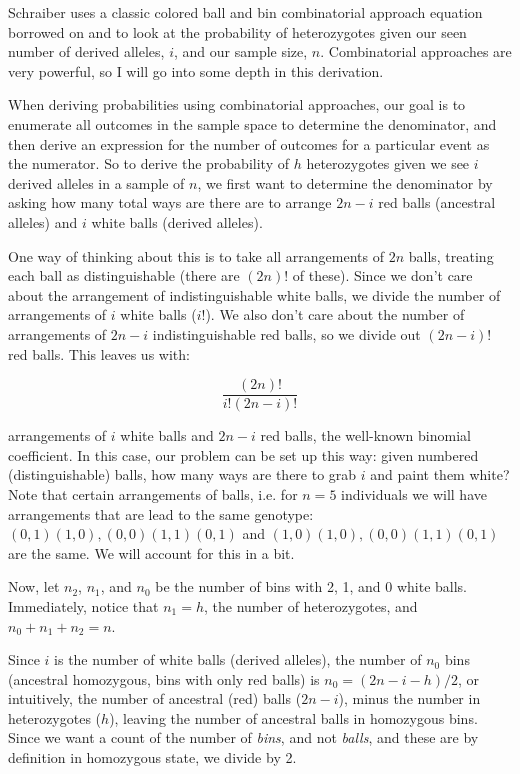 \documentclass[12pt]{article}\usepackage[]{graphicx}\usepackage[]{color}
\begin{document}
Schraiber uses a classic colored ball and bin combinatorial approach
equation borrowed on \cite{Levene:1949va} and \cite{Haldane:1954ts} to
look at the probability of heterozygotes given our seen number of
derived alleles, $i$, and our sample size, $n$. Combinatorial
approaches are very powerful, so I will go into some depth in this
derivation.

When deriving probabilities using combinatorial approaches, our goal
is to enumerate all outcomes in the sample space to determine the
denominator, and then derive an expression for the number of outcomes
for a particular event as the numerator. So to derive the probability
of $h$ heterozygotes given we see $i$ derived alleles in a sample of
$n$, we first want to determine the denominator by asking how many
total ways are there are to arrange $2n - i$ red balls (ancestral
alleles) and $i$ white balls (derived alleles). 

One way of thinking about this is to take all arrangements of $2n$
balls, treating each ball as distinguishable (there are $(2n)!$ of
these). Since we don't care about the arrangement of indistinguishable
white balls, we divide the number of arrangements of $i$ white balls
($i!$). We also don't care about the number of arrangements of $2n -
i$ indistinguishable red balls, so we divide out $(2n - i)!$ red
balls. This leaves us with:

\begin{equation} \label{eq:01}
\frac{(2n)!}{i! (2n - i)!}
\end{equation}

arrangements of $i$ white balls and $2n - i$ red balls, the well-known
binomial coefficient. In this case, our problem can be set up this
way: given numbered (distinguishable) balls, how many ways are there
to grab $i$ and paint them white? Note that certain arrangements of
balls, i.e. for $n = 5$ individuals we will have arrangements that are
lead to the same genotype: $(0, 1) (1, 0), (0, 0) (1, 1) (0, 1)$ and
$(1, 0) (1, 0), (0, 0) (1, 1) (0, 1)$ are the same. We will account
for this in a bit.

Now, let $n_2$, $n_1$, and $n_0$ be the number of bins with 2, 1, and
0 white balls. Immediately, notice that $n_1 = h$, the number of
heterozygotes, and $n_0 + n_1 + n_2 = n$.

Since $i$ is the number of white balls (derived alleles), the number
of $n_0$ bins (ancestral homozygous, bins with only red balls) is $n_0
= (2n - i - h)/2$, or intuitively, the number of ancestral (red) balls
($2n - i$), minus the number in heterozygotes ($h$), leaving the
number of ancestral balls in homozygous bins. Since we want a count of
the number of \emph{bins}, and not \emph{balls}, and these are by
definition in homozygous state, we divide by 2.
\end{document}
